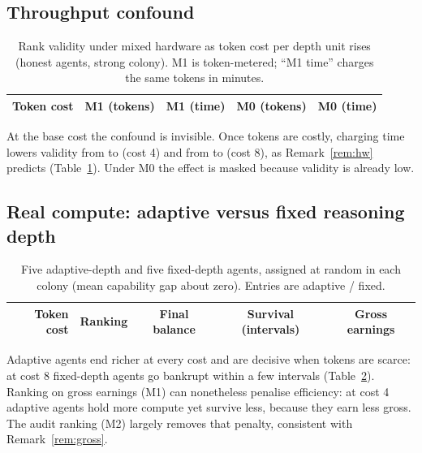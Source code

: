 \documentclass[11pt]{article}
\theoremstyle{plain}
\theoremstyle{remark}
\begin{document}
\subsection{Throughput confound}

\begin{table}[t]
\centering\small
\caption{Rank validity under mixed hardware as token cost per depth unit rises (honest agents, strong colony). M1 is token-metered; ``M1 time'' charges the same tokens in minutes.}
\label{tab:hw}
\begin{tabular}{@{}rllrr@{}}
\toprule
Token cost & M1 (tokens) & M1 (time) & M0 (tokens) & M0 (time) \\
\midrule

\bottomrule
\end{tabular}
\end{table}

At the base cost the confound is invisible. Once tokens are costly, charging time lowers validity from \HwTokFour{} to \HwTimeFour{} (cost 4) and from \HwTokEight{} to \HwTimeEight{} (cost 8), as Remark~\ref{rem:hw} predicts (Table~\ref{tab:hw}). Under M0 the effect is masked because validity is already low.

\subsection{Real compute: adaptive versus fixed reasoning depth}

\begin{table}[t]
\centering\small
\caption{Five adaptive-depth and five fixed-depth agents, assigned at random in each colony (mean capability gap about zero). Entries are adaptive / fixed.}
\label{tab:depth}
\begin{tabular}{@{}rlccc@{}}
\toprule
Token cost & Ranking & Final balance & Survival (intervals) & Gross earnings \\
\midrule

\bottomrule
\end{tabular}
\end{table}

Adaptive agents end richer at every cost and are decisive when tokens are scarce: at cost 8 fixed-depth agents go bankrupt within a few intervals (Table~\ref{tab:depth}). Ranking on gross earnings (M1) can nonetheless penalise efficiency: at cost 4 adaptive agents hold more compute yet survive less, because they earn less gross. The audit ranking (M2) largely removes that penalty, consistent with Remark~\ref{rem:gross}.
\end{document}
